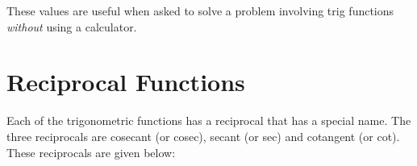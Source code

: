     \par
      \label{m39408*id81112}These values are useful when asked to solve a problem involving trig functions \textsl{without} using a calculator.\par 
\section{Reciprocal Functions}
\label{m39408*eip-466}Each of the trigonometric functions has a reciprocal that has a special name. The three reciprocals are cosecant (or cosec), secant (or sec) and cotangent (or cot). These reciprocals are given below:
\label{m39408*eid64932}\nopagebreak\noindent{}
